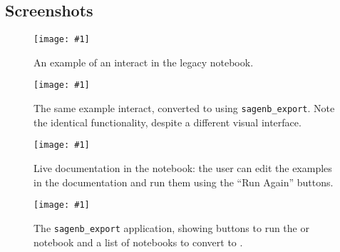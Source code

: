 \documentclass{deliverablereport}
\begin{document}
\clearpage
\appendix
\begin{landscape}
\section{Screenshots}

\newcommand{\screenshot}[2]{
\begin{figure}[ht]
  \texttt{[image: \#1]}
  \caption{#2}
\end{figure}}

\screenshot{interact-sagenb.png}{\label{fig-interact-sagenb}
  An example of an interact in the legacy \Sage notebook.}
\screenshot{interact-jupyter.png}{\label{fig-interact-jupyter}
  The same example interact, converted to \Jupyter using \texttt{sagenb\_export}.
  Note the identical functionality, despite a different visual interface.}
\screenshot{live-doc.png}{\label{fig-live-doc}
  Live documentation in the \Jupyter notebook:
  the user can edit the examples in the documentation and run them
  using the ``Run Again'' buttons.}
\screenshot{export.png}{\label{fig-export}
  The \texttt{sagenb\_export} application, showing
  buttons to run the \Sage or \Jupyter notebook and a list of \Sage notebooks
  to convert to \Jupyter.}
\end{landscape}
\clearpage
\end{document}
